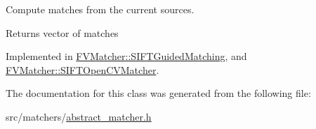 Compute matches from the current sources. 

\begin{DoxyReturn}{Returns}
vector of matches 
\end{DoxyReturn}


Implemented in \hyperlink{classFVMatcher_1_1SIFTGuidedMatching_a007fb8fd3c1c4679ec4c34611444552a}{F\+V\+Matcher\+::\+S\+I\+F\+T\+Guided\+Matching}, and \hyperlink{classFVMatcher_1_1SIFTOpenCVMatcher_a28119e90b4d7b71867d604a7aa082e1b}{F\+V\+Matcher\+::\+S\+I\+F\+T\+Open\+C\+V\+Matcher}.



The documentation for this class was generated from the following file\+:\begin{DoxyCompactItemize}
\item 
src/matchers/\hyperlink{abstract__matcher_8h}{abstract\+\_\+matcher.\+h}\end{DoxyCompactItemize}
